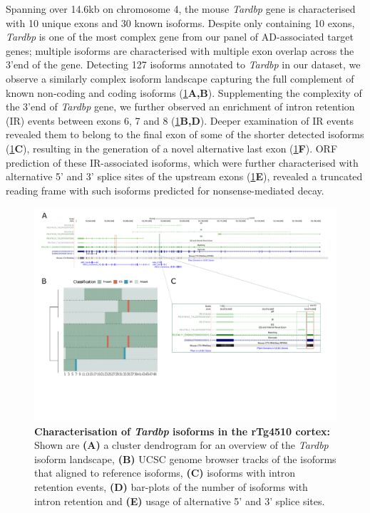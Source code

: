 Spanning over 14.6kb on chromosome 4, the mouse \textit{Tardbp} gene is characterised with 10 unique exons and 30 known isoforms. Despite only containing 10 exons, \textit{Tardbp} is one of the most complex gene from our panel of AD-associated target genes; multiple isoforms are characterised with multiple exon overlap across the 3'end of the gene. Detecting 127 isoforms annotated to \textit{Tardbp} in our dataset, we observe a similarly complex isoform landscape capturing the full complement of known non-coding and coding isoforms (\cref{fig:tardbp}\textbf{A,B}). Supplementing the complexity of the 3'end of \textit{Tardbp} gene, we further observed an enrichment of intron retention (IR) events between exons 6, 7 and 8 (\cref{fig:tardbp}\textbf{B,D}). Deeper examination of IR events revealed them to belong to the final exon of some of the shorter detected isoforms (\cref{fig:tardbp}\textbf{C}), resulting in the generation of a novel alternative last exon (\cref{fig:tardbp}\textbf{F}). ORF prediction of these IR-associated isoforms, which were further characterised with alternative 5' and 3' splice sites of the upstream exons (\cref{fig:tardbp}\textbf{E}), revealed a truncated reading frame with such isoforms predicted for nonsense-mediated decay. 


\begin{landscape}
	\begin{figure}[htp]
		\centering
		\captionsetup{width=1.3\textwidth}
		\includegraphics[page=11,trim={0 1cm 0 0},scale = 0.8]{Figures/TargetGenes_Annotation_Landscape.pdf}
		\caption[Characterisation of \textit{Tardbp} isoforms in the rTg4510 cortex]%
		{\textbf{Characterisation of \textit{Tardbp} isoforms in the rTg4510 cortex:} Shown are \textbf{(A)} a cluster dendrogram for an overview of the \textit{Tardbp} isoform landscape, \textbf{(B)} UCSC genome browser tracks of the isoforms that aligned to reference isoforms, \textbf{(C)} isoforms with intron retention events, \textbf{(D)} bar-plots of the number of isoforms with intron retention and \textbf{(E)} usage of alternative 5' and 3' splice sites.}    
		\label{fig:tardbp}
	\end{figure}
\end{landscape}
\restoregeometry

